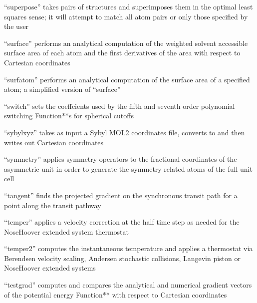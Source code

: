 \documentclass[letterpaper,11pt,english]{sphinxmanual}
\begin{document}

“superpose” takes pairs of structures and superimposes them in the optimal least squares sense; it will attempt to match all atom pairs or only those specified by the user


“surface” performs an analytical computation of the weighted solvent accessible surface area of each atom and the first derivatives of the area with respect to Cartesian coordinates


“surfatom” performs an analytical computation of the surface area of a specified atom; a simplified version of “surface”


“switch” sets the coeffcients used by the fifth and seventh order polynomial switching Function**s for spherical cutoffs


“sybylxyz” takes as input a Sybyl MOL2 coordinates file, converts to and then writes out Cartesian coordinates


“symmetry” applies symmetry operators to the fractional coordinates of the asymmetric unit in order to generate the symmetry related atoms of the full unit cell


“tangent” finds the projected gradient on the synchronous transit path for a point along the transit pathway


“temper” applies a velocity correction at the half time step as needed for the Nose\sphinxhyphen{}Hoover extended system thermostat


“temper2” computes the instantaneous temperature and applies a thermostat via Berendsen velocity scaling, Andersen stochastic collisions, Langevin piston or Nose\sphinxhyphen{}Hoover extended systems


“testgrad” computes and compares the analytical and numerical gradient vectors of the potential energy Function** with respect to Cartesian coordinates
\end{document}
